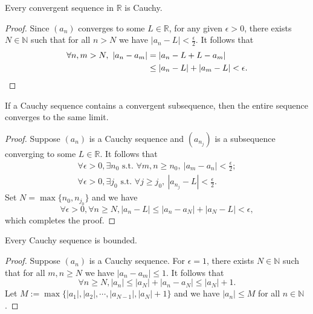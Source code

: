 \begin{lem}
  \label{lem:convergentSeqIsCauchy}
  Every convergent sequence in $\mathbb{R}$
  is Cauchy.
\end{lem}
\begin{proof}
  Since $(a_n)$ converges to some $L\in \mathbb{R}$,
  for any given $\epsilon>0$,
  there exists $N\in \mathbb{N}$ such that
  for all $n>N$ we have $|a_n-L|<\frac{\epsilon}{2}$.
  It follows that
  \begin{align*}
    \forall n,m>N,\  |a_n-a_m|
    &= |a_n-L+L-a_m|
    \\
    &\le |a_n-L| + |a_m-L| < \epsilon.\qedhere
  \end{align*}
\end{proof}

\begin{lem}
  \label{lem:CauchySubseqConvergence}
  If a Cauchy sequence contains a convergent subsequence,
  then the entire sequence converges to the same limit.
\end{lem}
\begin{proof}
  Suppose $(a_n)$ is a Cauchy sequence
  and $(a_{n_j})$ is a subsequence converging to some $L\in \mathbb{R}$.
  It follows that
  \begin{displaymath}
    \begin{array}{l}
    \forall \epsilon>0, \exists n_0 \text{ s.t. }
    \forall m,n\ge n_0,\  |a_m-a_n|< \frac{\epsilon}{2};
    \\
    \forall \epsilon>0, \exists j_0 \text{ s.t. }
    \forall j\ge j_0,\  |a_{n_j}-L|< \frac{\epsilon}{2}.
    \end{array}
  \end{displaymath}
  Set $N=\max\{n_0, n_{j_0}\}$ and we have
  \begin{displaymath}
    \forall \epsilon>0, \forall n\ge N, 
    |a_{n}-L|\le |a_{n}-a_N|+ |a_{N}-L|
    < \epsilon,
  \end{displaymath}
  which completes the proof.
\end{proof}

\begin{lem}
  \label{lem:CauchySeqIsBounded}
  Every Cauchy sequence is bounded.
\end{lem}
\begin{proof}
  Suppose $(a_{n})$ is a Cauchy sequence. For $\epsilon=1$,
  there exists $N\in \mathbb{N}$ such that for all $m,n\ge N$ we have
  $|a_{n}-a_{m}|\le 1$. It follows that
  \begin{displaymath}
    \forall n\ge N, |a_{n}|\le |a_{N}|+|a_{n}-a_{N}|\le |a_{N}|+1.
  \end{displaymath}
  Let $M:=\max\{|a_{1}|,|a_{2}|,\cdots,|a_{N-1}|,|a_{N}|+1\}$ and
  we have $|a_{n}|\le M$ for all $n\in \mathbb{N}$.
\end{proof}

